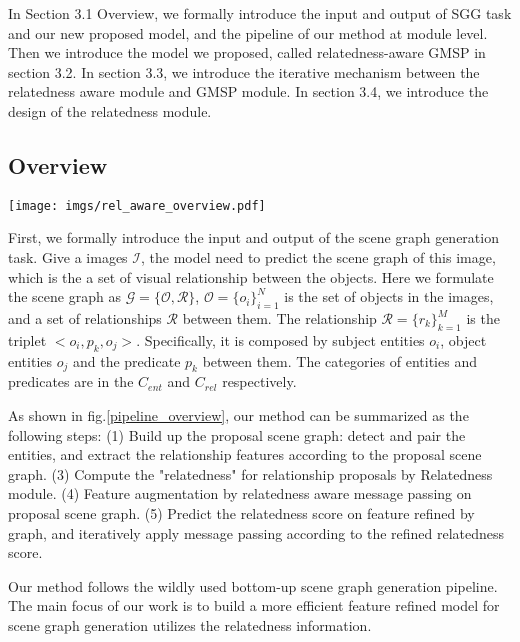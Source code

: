 In Section 3.1 Overview, we formally introduce the input and output of SGG task and our new proposed model, and the pipeline of our method at module level.
Then we introduce the model we proposed, called relatedness-aware GMSP in section 3.2.
In section 3.3, we introduce the iterative mechanism between the relatedness aware module and GMSP module. 
In section 3.4, we introduce the design of the relatedness module.

\subsection{Overview}


\begin{figure*}
    \centering
    \texttt{[image: imgs/rel\_aware\_overview.pdf]}
    \caption{}
    \label{pipeline_overview}
\end{figure*}
First, we formally introduce the input and output of the scene graph generation task. 
Give a images $\mathcal{I}$, the model need to predict the scene graph of this image, which is the a set of visual relationship between the objects.
Here we formulate the scene graph as $\mathcal{G}=\{\mathcal{O}, \mathcal{R}\}$, $\mathcal{O} = \{o_i\}_{i=1}^{N}$ is the set of objects in the images, and a set of relationships $\mathcal{R}$ between them. 
The relationship $\mathcal{R} = \{r_k\}_{k=1}^{M}$ is the triplet $<o_i, p_{k}, o_j>$. 
Specifically, it is composed by subject entities $o_i$, object entities $o_j$ and the predicate $p_k$ between them. The categories of entities and predicates are in the $C_{ent}$ and $C_{rel}$ respectively.


As shown in fig.\ref{pipeline_overview}, our method can be summarized as the following steps: 
(1) Build up the proposal scene graph: detect and pair the entities, and extract the relationship features according to the proposal scene graph.
(3) Compute the "relatedness" for relationship proposals by Relatedness module.
(4) Feature augmentation by relatedness aware message passing on proposal scene graph.
(5) Predict the relatedness score on feature refined by graph, and iteratively apply message passing according to the refined relatedness score.

Our method follows the wildly used bottom-up scene graph generation pipeline. 
The main focus of our work is to build a more efficient feature refined model for scene graph generation utilizes the relatedness information.

